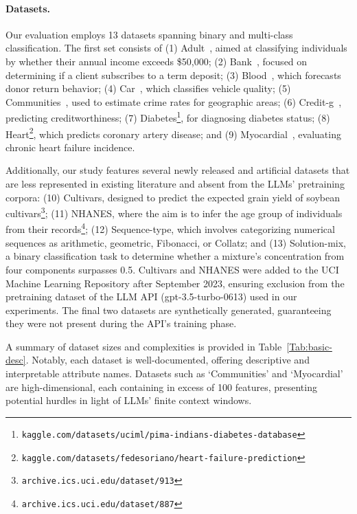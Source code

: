 \paragraph{Datasets.}
Our evaluation employs 13 datasets spanning binary and multi-class classification. The first set consists of (1) Adult~\cite{asuncion2007uci}, aimed at classifying individuals by whether their annual income exceeds \$50,000; (2) Bank~\cite{moro2014data}, focused on determining if a client subscribes to a term deposit; (3) Blood~\cite{yeh2009knowledge}, which forecasts donor return behavior; (4) Car~\cite{kadra2021well}, which classifies vehicle quality; (5) Communities~\cite{misc_communities_and_crime_183}, used to estimate crime rates for geographic areas; (6) Credit-g~\cite{kadra2021well}, predicting creditworthiness; (7) Diabetes\footnote{\texttt{kaggle.com/datasets/uciml/pima-indians-diabetes-database}}, for diagnosing diabetes status; (8) Heart\footnote{\texttt{kaggle.com/datasets/fedesoriano/heart-failure-prediction}}, which predicts coronary artery disease; and (9) Myocardial~\cite{misc_myocardial_infarction_complications_579}, evaluating chronic heart failure incidence.

Additionally, our study features several newly released and artificial datasets that are less represented in existing literature and absent from the LLMs' pretraining corpora: (10) Cultivars, designed to predict the expected grain yield of soybean cultivars\footnote{\texttt{archive.ics.uci.edu/dataset/913}}; (11) NHANES, where the aim is to infer the age group of individuals from their records\footnote{\texttt{archive.ics.uci.edu/dataset/887}}; (12) Sequence-type, which involves categorizing numerical sequences as arithmetic, geometric, Fibonacci, or Collatz; and (13) Solution-mix, a binary classification task to determine whether a mixture's concentration from four components surpasses 0.5. Cultivars and NHANES were added to the UCI Machine Learning Repository after September 2023, ensuring exclusion from the pretraining dataset of the LLM API (gpt-3.5-turbo-0613) used in our experiments. The final two datasets are synthetically generated, guaranteeing they were not present during the API’s training phase.

A summary of dataset sizes and complexities is provided in Table~\ref{Tab:basic-desc}. Notably, each dataset is well-documented, offering descriptive and interpretable attribute names. Datasets such as `Communities' and `Myocardial' are high-dimensional, each containing in excess of 100 features, presenting potential hurdles in light of LLMs’ finite context windows.

